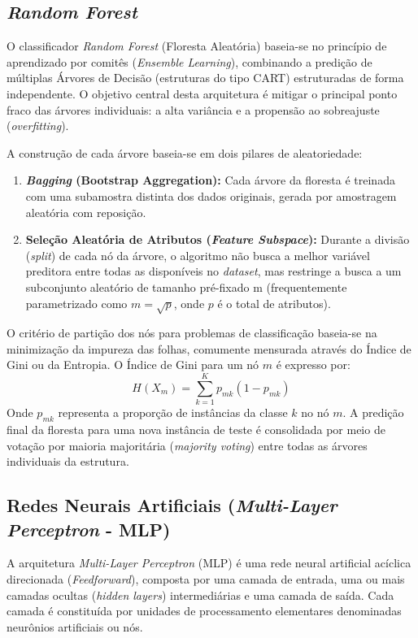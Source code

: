 \documentclass[12pt, a4paper]{article}
\begin{document}
\subsection{\textit{Random Forest}}

O classificador \textit{Random Forest} (Floresta Aleatória) baseia-se no princípio de aprendizado por comitês (\textit{Ensemble Learning}), combinando a predição de múltiplas Árvores de Decisão (estruturas do tipo CART) estruturadas de forma independente. O objetivo central desta arquitetura é mitigar o principal ponto fraco das árvores individuais: a alta variância e a propensão ao sobreajuste (\textit{overfitting}).

A construção de cada árvore baseia-se em dois pilares de aleatoriedade:
\begin{enumerate}
    \item \textbf{\textit{Bagging} (Bootstrap Aggregation):} Cada árvore da floresta é treinada com uma subamostra distinta dos dados originais, gerada por amostragem aleatória com reposição.
    \item \textbf{Seleção Aleatória de Atributos (\textit{Feature Subspace}):} Durante a divisão (\textit{split}) de cada nó da árvore, o algoritmo não busca a melhor variável preditora entre todas as disponíveis no \textit{dataset}, mas restringe a busca a um subconjunto aleatório de tamanho pré-fixado m (frequentemente parametrizado como $m = \sqrt{p}$, onde $p$ é o total de atributos).
\end{enumerate}

O critério de partição dos nós para problemas de classificação baseia-se na minimização da impureza das folhas, comumente mensurada através do Índice de Gini ou da Entropia. O Índice de Gini para um nó $m$ é expresso por:
\begin{equation}
H(X_m) = \sum_{k=1}^{K} p_{mk} (1 - p_{mk})
\end{equation}
Onde $p_{mk}$ representa a proporção de instâncias da classe $k$ no nó $m$. A predição final da floresta para uma nova instância de teste é consolidada por meio de votação por maioria majoritária (\textit{majority voting}) entre todas as árvores individuais da estrutura.

\subsection{Redes Neurais Artificiais (\textit{Multi-Layer Perceptron} - MLP)}

A arquitetura \textit{Multi-Layer Perceptron} (MLP) é uma rede neural artificial acíclica direcionada (\textit{Feedforward}), composta por uma camada de entrada, uma ou mais camadas ocultas (\textit{hidden layers}) intermediárias e uma camada de saída. Cada camada é constituída por unidades de processamento elementares denominadas neurônios artificiais ou nós.
\end{document}
